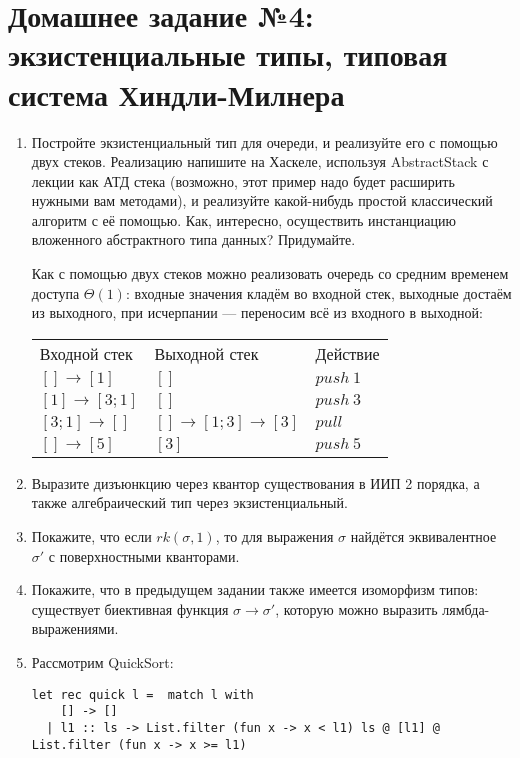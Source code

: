 \documentclass[10pt,a4paper,oneside]{article}
\begin{document}
\section*{Домашнее задание №4: экзистенциальные типы, типовая система Хиндли-Милнера}
\begin{enumerate}
\item Постройте экзистенциальный тип для очереди, и реализуйте его с помощью двух стеков.
Реализацию напишите на Хаскеле, используя AbstractStack с лекции как АТД стека 
(возможно, этот пример надо будет расширить нужными вам методами), и реализуйте 
какой-нибудь простой классический алгоритм с её помощью. Как, интересно, осуществить
инстанциацию вложенного абстрактного типа данных? Придумайте.

Как с помощью двух стеков можно реализовать очередь со средним временем доступа $\Theta(1)$:
входные значения кладём во входной стек, выходные достаём из выходного, при исчерпании ---
переносим всё из входного в выходной:

\begin{tabular}{lll}
Входной стек & Выходной стек & Действие\\
$[]\rightarrow[1]$ & $[]$ & $push\ 1$\\
$[1]\rightarrow[3;1]$ & $[]$ & $push\ 3$\\
$[3;1]\rightarrow[]$ & $[]\rightarrow[1;3]\rightarrow[3]$ & $pull$\\
$[]\rightarrow[5]$ & $[3]$ & $push\ 5$
\end{tabular}

\item Выразите дизъюнкцию через квантор существования в ИИП 2 порядка, а также алгебраический тип через экзистенциальный.

\item Покажите, что если $rk(\sigma,1)$, то для выражения $\sigma$ найдётся эквивалентное $\sigma'$ с поверхностными
кванторами. 

\item Покажите, что в предыдущем задании также имеется изоморфизм типов: существует биективная функция $\sigma\rightarrow\sigma'$,
которую можно выразить лямбда-выражениями.

\item Рассмотрим QuickSort:
\begin{verbatim}
let rec quick l =  match l with
    [] -> []
  | l1 :: ls -> List.filter (fun x -> x < l1) ls @ [l1] @ List.filter (fun x -> x >= l1)
\end{verbatim}


\end{enumerate}
\end{document}
